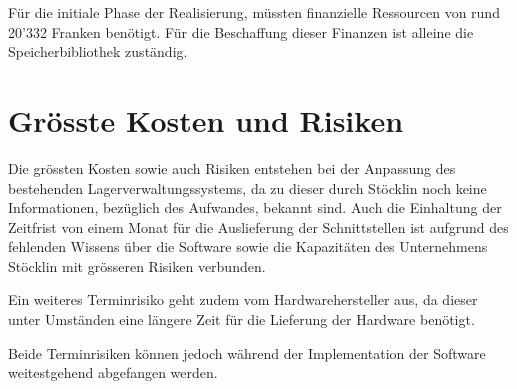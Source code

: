 Für die initiale Phase der Realisierung, müssten finanzielle Ressourcen von rund 20'332 Franken benötigt. Für die Beschaffung dieser Finanzen ist alleine die Speicherbibliothek zuständig.

\section{Grösste Kosten und Risiken}
Die grössten Kosten sowie auch Risiken entstehen bei der Anpassung des bestehenden Lagerverwaltungssystems, da zu dieser durch Stöcklin noch keine Informationen, bezüglich des Aufwandes, bekannt sind. Auch die Einhaltung der Zeitfrist von einem Monat für die Auslieferung der Schnittstellen ist aufgrund des fehlenden Wissens über die Software sowie die Kapazitäten des Unternehmens Stöcklin mit grösseren Risiken verbunden.

Ein weiteres Terminrisiko geht zudem vom Hardwarehersteller aus, da dieser unter Umständen eine längere Zeit für die Lieferung der Hardware benötigt.

Beide Terminrisiken können jedoch während der Implementation der Software weitestgehend abgefangen werden.
